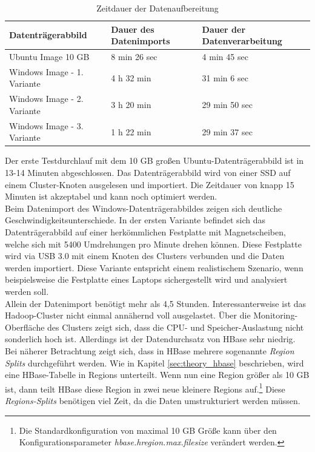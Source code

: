 \begin{table}[ht]
\centering
\begin{tabular}{l|l|l}
Datenträgerabbild & Dauer des Datenimports & Dauer der Datenverarbeitung	\\ \hline
Ubuntu Image  10 GB		& 8 min 26 sec	& 4 min 45 sec  \\ \hline
Windows Image - 1. Variante 		& 4 h 32 min		& 31 min 6 sec	\\
Windows Image - 2. Variante 		& 3 h 20 min 	& 29 min 50 sec \\
Windows Image - 3. Variante 		& 1 h 22 min		& 29 min 37 sec \\
\end{tabular}
\caption{Zeitdauer der Datenaufbereitung}
\label{tab:performance_results}
\end{table}

\noindent
Der erste Testdurchlauf mit dem 10 GB großen Ubuntu-Datenträgerabbild ist in 13-14 Minuten abgeschlossen. Das Datenträgerabbild wird von einer SSD auf einem Cluster-Knoten ausgelesen und importiert. Die Zeitdauer von knapp 15 Minuten ist akzeptabel und kann noch optimiert werden.\\

\noindent
Beim Datenimport des Windows-Datenträgerabbildes zeigen sich deutliche Geschwindigkeitsunterschiede. In der ersten Variante befindet sich das Datenträgerabbild auf einer herkömmlichen Festplatte mit Magnetscheiben, welche sich mit 5400 Umdrehungen pro Minute drehen können. Diese Festplatte wird via USB 3.0 mit einem Knoten des Clusters verbunden und die Daten werden importiert. Diese Variante entspricht einem realistischem Szenario, wenn beispielsweise die Festplatte eines Laptops sichergestellt wird und analysiert werden soll.\\
Allein der Datenimport benötigt mehr als 4,5 Stunden. Interessanterweise ist das Hadoop-Cluster nicht einmal annähernd voll ausgelastet. Über die Monitoring-Oberfläche des Clusters zeigt sich, dass die CPU- und Speicher-Auslastung nicht sonderlich hoch ist. Allerdings ist der Datendurchsatz von HBase sehr niedrig. Bei näherer Betrachtung zeigt sich, dass in HBase mehrere sogenannte \textit{Region Splits} durchgeführt werden. Wie in Kapitel \ref{sec:theory_hbase} beschrieben, wird eine HBase-Tabelle in Regions unterteilt. Wenn nun eine Region größer als 10 GB ist, dann teilt HBase diese Region in zwei neue kleinere Regions auf.\footnote{Die Standardkonfiguration von maximal 10 GB Größe kann über den Konfigurationsparameter \textit{hbase.hregion.max.filesize} verändert werden.} Diese \textit{Regions-Splits} benötigen viel Zeit, da die Daten umstrukturiert werden müssen.\\

